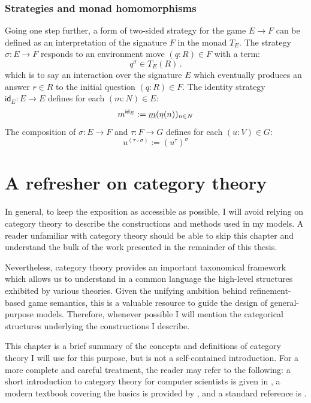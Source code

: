 \documentclass[11pt,oneside,draft]{book}
\theoremstyle{definition}
\newcommand{\kw}[1]{\ensuremath{ \mathsf{#1} }}
\newcommand{\ul}[1]{%
  \underline{\smash{#1}}
}
\begin{document}

\subsection{Strategies and monad homomorphisms}

Going one step further,
a form of
two-sided strategy for the game $E \rightarrow F$
can be defined as an interpretation of the signature $F$
in the monad $T_E$.
The strategy $\sigma : E \rightarrow F$
responds to an environment move
$(q \mathop{:} R) \in F$
with a term:
\[
  q^\sigma \in T_E(R)
  \,.
\]
which is to say an interaction over the signature $E$
which eventually produces an answer $r \in R$
to the initial question $(q \mathop{:} R) \in F$.
The identity strategy $\kw{id}_E : E \rightarrow E$
defines for each $(m \mathop{:} N) \in E$:
\[
  m^{\kw{id}_E} := \ul{m}(\eta(n))_{n \in N}
\]
The composition of $\sigma : E \rightarrow F$ and
$\tau : F \rightarrow G$
defines for each $(u \mathop{:} V) \in G$:
\[
  u^{(\tau \circ \sigma)} :=
    (u^\tau)^\sigma
\]




\chapter{A refresher on category theory} \label{chap:ct} %


In general,
to keep the exposition
as accessible as possible,
I will avoid relying on category theory
to describe the constructions and methods
used in my models.
A reader unfamiliar with category theory
should be able to skip this chapter
and understand the bulk of the work presented
in the remainder of this thesis.

Nevertheless,
category theory provides an important
taxonomical framework
which allows us to understand
in a common language
the high-level structures
exhibited by various theories.
Given the unifying ambition behind
refinement-based game semantics,
this is a valuable resource
to guide the design of general-purpose models.
Therefore,
whenever possible I will mention the categorical structures
underlying the constructions I describe.

This chapter is a brief summary of the concepts and definitions
of category theory I will use for this purpose,
but is not a self-contained introduction.
For a more complete and careful treatment,
the reader may refer to the following:
a short introduction to category theory for computer scientists
is given in \citet{ctcs},
a modern textbook covering the basics is provided by \cite{awodeyct},
and a standard reference is \cite{maclane}.
\end{document}
